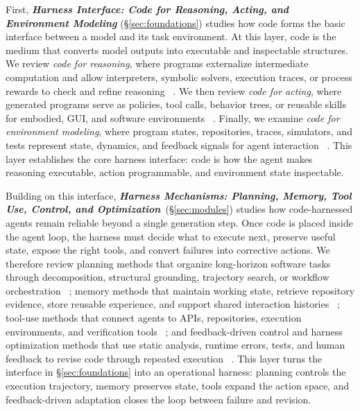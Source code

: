 \documentclass{llmxive}
\begin{document}
First, \emph{\textbf{Harness Interface: Code for Reasoning, Acting, and
Environment Modeling}} (\S\ref{sec:foundations}) studies how code
forms the basic interface between a model and its task
environment.
At this layer, code is the medium that converts model outputs into
executable and inspectable structures.
We review \emph{code for reasoning}, where programs externalize
intermediate computation and allow interpreters, symbolic solvers,
execution traces, or process rewards to check and refine reasoning
~\cite{gao2023pal,chen2022program,li2023chain,ye2023satlm,ni2024next,li2025codeprm}.
We then review \emph{code for acting}, where generated programs
serve as policies, tool calls, behavior trees, or reusable skills
for embodied, GUI, and software environments
~\cite{ahn2022can,liang2023code,wang2023voyager,mu2024robocodex,zhang2025codebt,lin2026ui}.
Finally, we examine \emph{code for environment modeling}, where
program states, repositories, traces, simulators, and tests
represent state, dynamics, and feedback signals for agent
interaction
~\cite{tang2024worldcoder,copet2025cwm,zheng2026code2world,jimenez2023swe,liu2023agentbench,gandhi2026endless}.
This layer establishes the core harness interface: code is how the
agent makes reasoning executable, action programmable, and
environment state inspectable.

Building on this interface, \emph{\textbf{Harness Mechanisms:
Planning, Memory, Tool Use, Control, and Optimization}}~(\S\ref{sec:modules})
studies how code-harnessed agents remain reliable beyond a single
generation step.
Once code is placed inside the agent loop, the harness must decide
what to execute next, preserve useful state, expose the right
tools, and convert failures into corrective actions.
We therefore review planning methods that organize long-horizon
software tasks through decomposition, structural grounding,
trajectory search, or workflow orchestration
~\cite{jiang2024selfplanning,gur2023webagent,bairi2024codeplan,li2025codetree,islam2024mapcoder};
memory methods that maintain working state, retrieve repository
evidence, store reusable experience, and support shared
interaction histories
~\cite{gaurav2025codemem,zhang2024autocoderover,zhang2023repocoder,wang2026memgovern};
tool-use methods that connect agents to APIs, repositories,
execution environments, and verification tools
~\cite{zhang2023toolcoder,liu2024toolnet};
and feedback-driven control and harness optimization methods that use static analysis,
runtime errors, tests, and human feedback to revise code through
repeated execution
~\cite{huang2023agentcoder,ukai2024adacoder,Nunez2024AutoSafeCoder,li2026agentharness}.
This layer turns the interface in \S\ref{sec:foundations} into an
operational harness: planning controls the execution trajectory,
memory preserves state, tools expand the action space, and
feedback-driven adaptation closes the loop between failure and revision.
\end{document}
